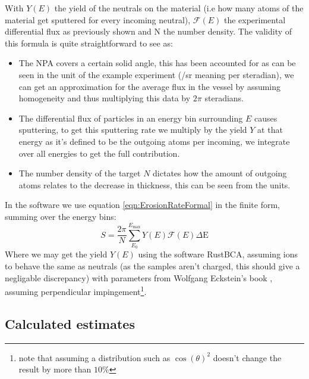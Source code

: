 \documentclass{article}
\begin{document}
With $Y(E)$ the yield of the neutrals on the material (i.e how many atoms of
the material get sputtered for every incoming neutral), $\mathcal{F}(E)$ the
experimental differential flux as previously shown and N the number density.
The validity of this formula is quite straightforward to see as:
\begin{itemize}
    \item The NPA covers a certain solid angle, this has been accounted for as
        can be seen in the unit of the example experiment (/sr meaning per
        steradian), we can get an approximation for the average
        flux in the vessel by assuming homogeneity and thus multiplying this
data by $2\pi$ steradians. 
    \item The differential flux of particles in an energy bin surrounding $E$ causes sputtering, to get this
        sputtering rate we multiply by the yield $Y$ at that energy as it's defined to be the
        outgoing atoms per incoming, we integrate over all energies to get the
        full contribution. 
    \item The number density of the target $N$ dictates how the amount of
        outgoing atoms relates to the decrease in thickness, this can be seen from the units.
\end{itemize}
In the software we use equation \ref{eqn:ErosionRateFormal} in the finite form,
summing over the energy bins:
\begin{equation}
S = \frac{2\pi}{N}\sum_{E_0}^{E_{\text{max}}} Y(E)\mathcal{F}(E)\Delta\text{E}
    \label{eqn:ErosionRateFinite}
\end{equation}
Where we may get the yield $Y(E)$ using the software RustBCA\cite{RustBCA},
assuming ions to behave the same as neutrals (as the samples aren't charged,
this should give a negligable discrepancy) with parameters from Wolfgang Eckstein's
book \cite{eckstein2013computer}, assuming perpendicular impingement\footnote{note that
assuming a distribution such as $\cos(\theta)^2$ doesn't change the result by more than $10\%$}.
\subsection{Calculated estimates}



\end{document}
